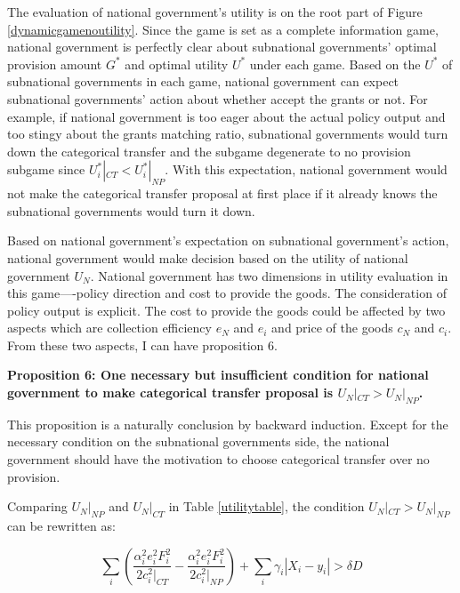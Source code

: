 \begin{itemize}
The evaluation of national government's utility is on the root part of Figure \ref{dynamicgamenoutility}. Since the game is set as a complete information game, national government is perfectly clear about subnational governments' optimal provision amount $G^*$ and optimal utility $U^*$ under each game. Based on the $U^*$ of subnational governments in each game, national government can expect subnational governments' action about whether accept the grants or not. For example, if national government is too eager about the actual policy output and too stingy about the grants matching ratio, subnational governments would turn down the categorical transfer and the subgame degenerate to no provision subgame since $U_i^*|_{CT}< U_i^*|_{NP}$. With this expectation, national government would not make the categorical transfer proposal at first place if it already knows the subnational governments would turn it down.

Based on national government's expectation on subnational government's action, national government would make decision based on the utility of national government $U_N$. National government has two dimensions in utility evaluation in this game----policy direction and cost to provide the goods. The consideration of policy output is explicit. The cost to provide the goods could be affected by two aspects which are collection efficiency $e_N$ and $e_i$ and price of the goods $c_N$ and $c_i$. From these two aspects, I can have proposition 6.

\textbf{Proposition 6: One necessary but insufficient condition for national government to make categorical transfer proposal is $U_N|_{CT} > U_N|_{NP}$.}

This proposition is a naturally conclusion by backward induction. Except for the necessary condition on the subnational governments side, the national government should have the motivation to choose categorical transfer over no provision.

Comparing $U_N|_{NP}$ and $U_N|_{CT}$ in Table \ref{utilitytable}, the condition $U_N|_{CT} > U_N|_{NP}$ can be rewritten as:

\begin{equation}
    \sum_i(\frac{\alpha_i^2e_i^2F_i^2}{2c_i^2|_{CT}}-\frac{\alpha_i^2e_i^2F_i^2}{2c_i^2|_{NP}}) +\sum_i\gamma_i|X_i-y_i|>\delta D
\end{equation}


\end{itemize}
